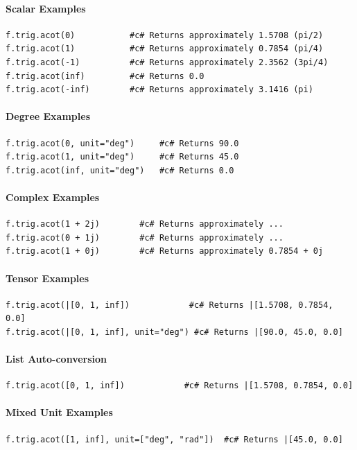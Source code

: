 \paragraph{Scalar Examples}
\begin{verbatim}
f.trig.acot(0)           #c# Returns approximately 1.5708 (pi/2)
f.trig.acot(1)           #c# Returns approximately 0.7854 (pi/4)
f.trig.acot(-1)          #c# Returns approximately 2.3562 (3pi/4)
f.trig.acot(inf)         #c# Returns 0.0
f.trig.acot(-inf)        #c# Returns approximately 3.1416 (pi)
\end{verbatim}

\paragraph{Degree Examples}
\begin{verbatim}
f.trig.acot(0, unit="deg")     #c# Returns 90.0
f.trig.acot(1, unit="deg")     #c# Returns 45.0
f.trig.acot(inf, unit="deg")   #c# Returns 0.0
\end{verbatim}

\paragraph{Complex Examples}
\begin{verbatim}
f.trig.acot(1 + 2j)        #c# Returns approximately ...
f.trig.acot(0 + 1j)        #c# Returns approximately ...
f.trig.acot(1 + 0j)        #c# Returns approximately 0.7854 + 0j
\end{verbatim}

\paragraph{Tensor Examples}
\begin{verbatim}
f.trig.acot(|[0, 1, inf])            #c# Returns |[1.5708, 0.7854, 0.0]
f.trig.acot(|[0, 1, inf], unit="deg") #c# Returns |[90.0, 45.0, 0.0]
\end{verbatim}

\paragraph{List Auto-conversion}
\begin{verbatim}
f.trig.acot([0, 1, inf])            #c# Returns |[1.5708, 0.7854, 0.0]
\end{verbatim}

\paragraph{Mixed Unit Examples}
\begin{verbatim}
f.trig.acot([1, inf], unit=["deg", "rad"])  #c# Returns |[45.0, 0.0]
\end{verbatim}

